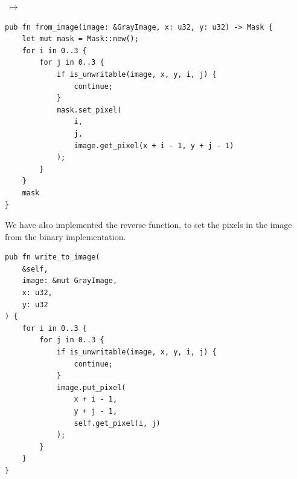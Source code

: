 \documentclass[12pt]{article}
\begin{document}
\begin{center}
    $\; \mapsto \; $
\end{center}

\vfill
\pagebreak[2]

\begin{lstlisting}
pub fn from_image(image: &GrayImage, x: u32, y: u32) -> Mask {
    let mut mask = Mask::new();
    for i in 0..3 {
        for j in 0..3 {
            if is_unwritable(image, x, y, i, j) {
                continue;
            }
            mask.set_pixel(
                i, 
                j, 
                image.get_pixel(x + i - 1, y + j - 1)
            );
        }
    }
    mask
}
\end{lstlisting}

\vspace{2em}
We have also implemented the reverse function,
to set the pixels in the image from the binary implementation.

\begin{lstlisting}
pub fn write_to_image(
    &self, 
    image: &mut GrayImage, 
    x: u32, 
    y: u32
) {
    for i in 0..3 {
        for j in 0..3 {
            if is_unwritable(image, x, y, i, j) {
                continue;
            }
            image.put_pixel(
                x + i - 1, 
                y + j - 1, 
                self.get_pixel(i, j)
            );
        }
    }
}
\end{lstlisting}
\end{document}
